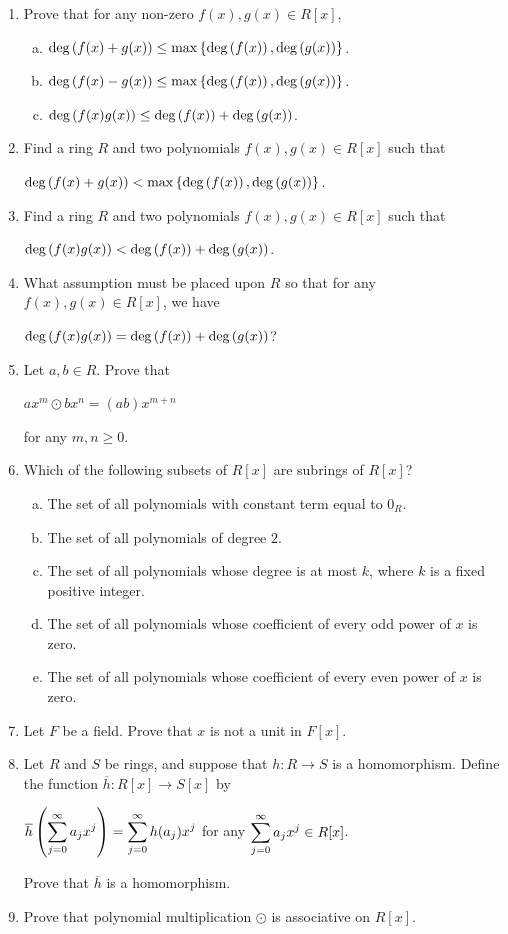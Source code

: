 \documentclass[11pt,fleqn,dvipsnames,usenames]{article}
\begin{document}
\begin{enumerate}[1.]
\item Prove that for any non-zero $f(x),g(x)\in R[x]$,
\begin{enumerate}[(a)]
\item $\text{deg}\left(f(x)+g(x)\right)\leq \max\left\{\text{deg}\left(f(x)\right), \text{deg}\left(g(x)\right)\right\}$.
\item $\text{deg}\left(f(x)-g(x)\right)\leq \max\left\{\text{deg}\left(f(x)\right), \text{deg}\left(g(x)\right)\right\}$.
\item $\text{deg}\left(f(x)g(x)\right)\leq \text{deg}\left(f(x)\right) + \text{deg}\left(g(x)\right)$.
\end{enumerate}

\item Find a ring $R$ and two polynomials $f(x),g(x)\in R[x]$ such that
\begin{center}
$\text{deg}\left(f(x) + g(x)\right) < \max\left\{\text{deg}\left(f(x)\right), \text{deg}\left(g(x)\right)\right\}$.
\end{center}

\item Find a ring $R$ and two polynomials $f(x),g(x)\in R[x]$ such that
\begin{center}
$\text{deg}\left(f(x)g(x)\right) < \text{deg}\left(f(x)\right) + \text{deg}\left(g(x)\right)$.
\end{center}

\item What assumption must be placed upon $R$ so that for any $f(x),g(x)\in R[x]$, we have
\begin{center}
$\text{deg}\left(f(x)g(x)\right) = \text{deg}\left(f(x)\right) + \text{deg}\left(g(x)\right)$?
\end{center}

\item Let $a,b\in R$.  Prove that
\begin{center}
$ax^{m}\odot bx^{n} = (ab)x^{m+n}$
\end{center}
for any $m,n\geq 0$.

\item Which of the following subsets of $R[x]$ are subrings of $R[x]$?
\begin{enumerate}[(a)]
\item The set of all polynomials with constant term equal to $0_{R}$.
\item The set of all polynomials of degree $2$.
\item The set of all polynomials whose degree is at most $k$, where $k$ is a fixed positive integer.
\item The set of all polynomials whose coefficient of every odd power of $x$ is zero.
\item The set of all polynomials whose coefficient of every even power of $x$ is zero.
\end{enumerate}
\item Let $F$ be a field.  Prove that $x$ is not a unit in $F[x]$.
\item Let $R$ and $S$ be rings, and suppose that $h:R\to S$ is a homomorphism.  Define the function $\overline{h}:R[x]\to S[x]$ by
\begin{center}
$\overline{h}\left(\displaystyle\sum\limits_{j=0}^{\infty}a_{j}x^{j}\right) = \displaystyle\sum\limits_{j=0}^{\infty}h(a_{j})x^{j}$ for any $\displaystyle\sum\limits_{j=0}^{\infty}a_{j}x^{j}\in R[x]$.
\end{center}
Prove that $\overline{h}$ is a homomorphism.

\item Prove that polynomial multiplication $\odot$ is associative on $R[x]$.
\end{enumerate}
\end{document}
